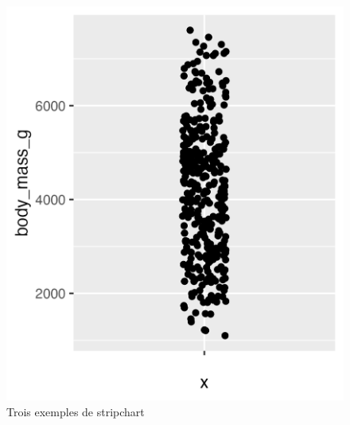 \documentclass[
  letterpaper,
  DIV=11,
  numbers=noendperiod]{scrreprt}
\begin{document}
\begin{figure}
\begin{minipage}[t]{0.33\linewidth}
{{\includegraphics{./03-visualization_files/figure-pdf/fig-jitter-3.png}

}

}

\end{minipage}%

\caption{\label{fig-jitter}Trois exemples de stripchart}

\end{figure}
\end{document}
